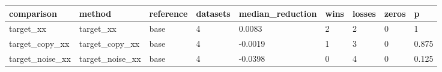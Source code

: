 \begin{tabular}{lllllllll}
\toprule
comparison & method & reference & datasets & median\_reduction & wins & losses & zeros & p \\
\midrule
target\_xx & target\_xx & base & 4 & 0.0083 & 2 & 2 & 0 & 1 \\
target\_copy\_xx & target\_copy\_xx & base & 4 & -0.0019 & 1 & 3 & 0 & 0.875 \\
target\_noise\_xx & target\_noise\_xx & base & 4 & -0.0398 & 0 & 4 & 0 & 0.125 \\
\bottomrule
\end{tabular}
